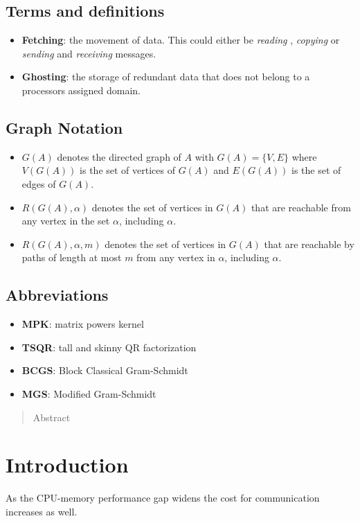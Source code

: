 \documentclass{scrartcl}
\begin{document}
\subsection*{Terms and definitions}
\begin{itemize}
\item \textbf{Fetching}: the movement of data. This could either be \textit{reading} , \textit{copying} or \textit{sending} and \textit{receiving} messages.
\item \textbf{Ghosting}: the storage of redundant data that does not belong to a processors assigned domain.
\end{itemize}
\subsection*{Graph Notation}
\begin{itemize}
\item $G(A)$ denotes the directed graph of $A$ with $G(A) = \{V,E\}$ where $V(G(A))$ is the set of vertices of $G(A)$ and $E(G(A))$ is the set of edges of $G(A)$.
\item $R(G(A), \alpha)$ denotes the set of vertices in $G(A)$ that are reachable from any vertex in the set $\alpha$, including $\alpha$.
\item $R(G(A), \alpha, m)$ denotes the set of vertices in $G(A)$ that are reachable by paths of length at most $m$ from any vertex in $\alpha$, including $\alpha$.
\end{itemize}
\subsection*{Abbreviations}
\begin{itemize}
\item \textbf{MPK}: matrix powers kernel
\item \textbf{TSQR}: tall and skinny QR factorization
\item \textbf{BCGS}: Block Classical Gram-Schmidt
\item \textbf{MGS}: Modified Gram-Schmidt
\end{itemize}
\pagebreak

\begin{abstract}
Abstract
\end{abstract}
\section{Introduction}
As the CPU-memory performance gap widens the cost for communication increases as well.
\end{document}
